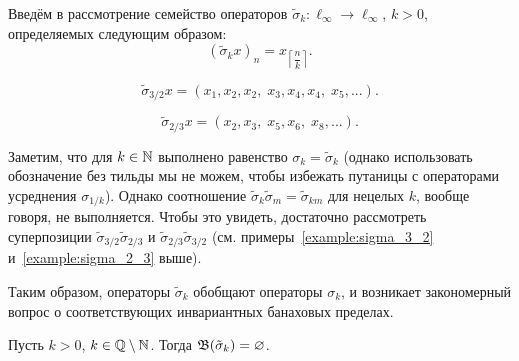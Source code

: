 Введём в рассмотрение семейство операторов
$\tilde\sigma_k : \ell_\infty \to \ell_\infty$, $k>0$,
определяемых следующим образом:
\begin{equation}
	(\tilde\sigma_k x)_n = x_{\left\lceil \dfrac{n}{k}\right\rceil}
	.
\end{equation}

\begin{example}
	\label{example:sigma_3_2}
	\begin{equation}
		\tilde\sigma_{3/2} x =
		(x_1, x_2, x_2, \; x_3, x_4, x_4, \; x_5, ...)
		.
	\end{equation}
\end{example}

\begin{example}
	\label{example:sigma_2_3}
	\begin{equation}
		\tilde\sigma_{2/3} x =
		(x_2, x_3, \; x_5, x_6, \; x_8, ...)
		.
	\end{equation}
\end{example}


Заметим, что для $k\in \mathbb{N}$ выполнено равенство $\sigma_k = \tilde\sigma_k$
(однако использовать обозначение без тильды мы не можем, чтобы избежать путаницы с операторами усреднения $\sigma_{1/k}$).
Однако соотношение $\tilde\sigma_k \tilde\sigma_m = \tilde\sigma_{km}$ для нецелых $k$, вообще говоря, не выполняется.
Чтобы это увидеть, достаточно рассмотреть суперпозиции $\tilde\sigma_{3/2} \tilde\sigma_{2/3}$ и
$\tilde\sigma_{2/3} \tilde\sigma_{3/2}$ (см. примеры~\ref{example:sigma_3_2} и~\ref{example:sigma_2_3} выше).

Таким образом, операторы $\tilde\sigma_k$ обобщают операторы $\sigma_k$,
и возникает закономерный вопрос о соответствующих инвариантных банаховых пределах.

\begin{theorem}
	Пусть $k>0$, $k\in \mathbb{Q} \setminus \mathbb{N}$.
	Тогда $\mathfrak{B}(\tilde\sigma_k)=\varnothing$.
\end{theorem}

